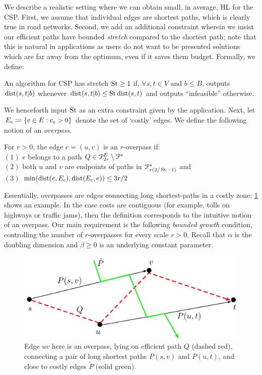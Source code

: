 We describe a realistic setting where we can obtain small, in average, HL for the CSP.
First, we assume that individual edges are shortest paths, which is clearly true in road networks.
Second, we add an additional constraint wherein we insist our efficient paths have bounded \emph{stretch} compared to the shortest path; note that this is natural in applications as users do not want to be presented solutions which are far away from the optimum, even if it saves them budget.
Formally, we define:

\begin{definition}[Stretch]
	An algorithm for CSP has stretch $\operatorname{St}\geq 1$ if, $\forall s,t\in V$ and $b\leq B$, outputs $\mbox{dist}(s,t|b)$ whenever $\mbox{dist}(s,t|b)\leq \operatorname{St}\mbox{dist}(s,t)$ and outputs ``infeasible'' otherwise.
\end{definition}
We henceforth input $\operatorname{St}$ as an extra constraint given by the application. 
Next, let $E_c\coloneqq\{e\in E:c_e>0\}$ denote the set of `costly' edges.
We define the following notion of an \emph{overpass}.

\begin{definition}[Overpass]
For $r>0$, the edge $e=(u,v)$ is an $r$-overpass if:\\
$(1)$ $e$ belongs to a path $Q\in\mathcal{P}^E_{2r}\setminus\mathcal{P}^*$\\
$(2)$ both $u$ and $v$ are endpoints of paths in $\mathcal{P}^*_{r(2/\operatorname{St}-1)}$ and\\ 
$(3)$ $\min(\mbox{dist}(e,E_c),\mbox{dist}(E_c,e))\leq 3r/2$
\end{definition} 
Essentially, overpasses are edges connecting long shortest-paths in a costly zone; \cref{fig:overpass} shows an example. 
In the case costs are contiguous (for example, tolls on highways or traffic jams), then the definition corresponds to the intuitive notion of an overpass.
Our main requirement is the following \emph{bounded growth} condition, controlling the number of $r$-overpasses for every scale $r>0$.
Recall that $\alpha$ is the doubling dimension and $\beta\geq 0$ is an underlying constant parameter.

\begin{figure}[!b]
	\centering
	\includegraphics[scale=0.7]{TexImg/overpass.pdf}
	\caption{Edge $uv$ here is an overpass, lying on efficient path $Q$ (dashed red), connecting a pair of long shortest paths $P(s,v)$ and $P(u,t)$, and close to costly edges $\tilde P$ (solid green). } 
	\label{fig:overpass}
\end{figure}



